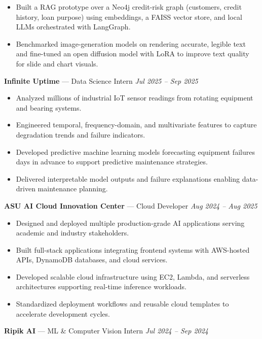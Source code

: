 \documentclass[a4paper,8pt]{extarticle}
\begin{document}
\begin{itemize}
\item Built a RAG prototype over a Neo4j credit-risk graph (customers, credit history, loan purpose) using embeddings, a FAISS vector store, and local LLMs orchestrated with LangGraph.
\item Benchmarked image-generation models on rendering accurate, legible text and fine-tuned an open diffusion model with LoRA to improve text quality for slide and chart visuals.
\end{itemize}

\noindent
\textbf{Infinite Uptime} --- Data Science Intern
\hfill \textit{Jul 2025 -- Sep 2025}

\begin{itemize}
\item Analyzed millions of industrial IoT sensor readings from rotating equipment and bearing systems.
\item Engineered temporal, frequency-domain, and multivariate features to capture degradation trends and failure indicators.
\item Developed predictive machine learning models forecasting equipment failures days in advance to support predictive maintenance strategies.
\item Delivered interpretable model outputs and failure explanations enabling data-driven maintenance planning.
\end{itemize}

\noindent
\textbf{ASU AI Cloud Innovation Center} --- Cloud Developer
\hfill \textit{Aug 2024 -- Aug 2025}

\begin{itemize}
\item Designed and deployed multiple production-grade AI applications serving academic and industry stakeholders.
\item Built full-stack applications integrating frontend systems with AWS-hosted APIs, DynamoDB databases, and cloud services.
\item Developed scalable cloud infrastructure using EC2, Lambda, and serverless architectures supporting real-time inference workloads.
\item Standardized deployment workflows and reusable cloud templates to accelerate development cycles.
\end{itemize}

\noindent
\textbf{Ripik AI} --- ML \& Computer Vision Intern
\hfill \textit{Jul 2024 -- Sep 2024}
\end{document}
